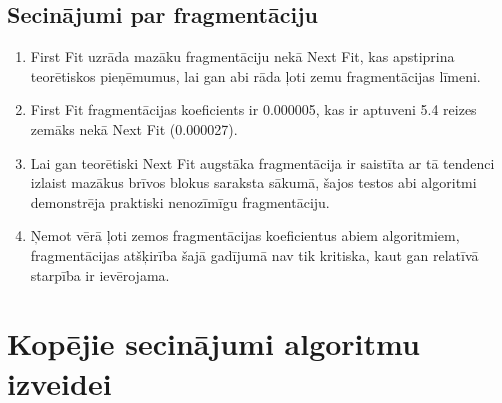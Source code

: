 \documentclass{report}
\begin{document}
	\subsection{Secinājumi par fragmentāciju}
	
	\begin{enumerate}
		\item First Fit uzrāda mazāku fragmentāciju nekā Next Fit, kas apstiprina teorētiskos pieņēmumus, lai gan abi rāda ļoti zemu fragmentācijas līmeni.
		
		\item First Fit fragmentācijas koeficients ir 0.000005, kas ir aptuveni 5.4 reizes zemāks nekā Next Fit (0.000027).
		
		\item Lai gan teorētiski Next Fit augstāka fragmentācija ir saistīta ar tā tendenci izlaist mazākus brīvos blokus saraksta sākumā, šajos testos abi algoritmi demonstrēja praktiski nenozīmīgu fragmentāciju.
		
		\item Ņemot vērā ļoti zemos fragmentācijas koeficientus abiem algoritmiem, fragmentācijas atšķirība šajā gadījumā nav tik kritiska, kaut gan relatīvā starpība ir ievērojama.
	\end{enumerate}
	
	\section{Kopējie secinājumi algoritmu izveidei}
	
\end{document}
